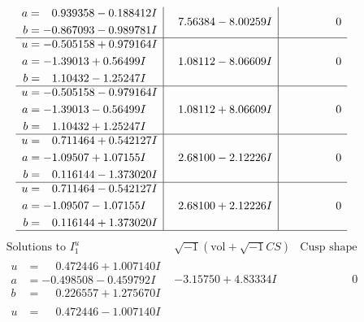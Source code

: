 \documentclass[1p]{elsarticle_modified}
\theoremstyle{definition}
\newcommand{\I}{\sqrt{-1}}
\begin{document}
$$\begin{array}{c|c|c}
\begin{aligned}
a &= \phantom{-}0.939358 - 0.188412 I \\
b &= -0.867093 - 0.989781 I\end{aligned}
 & \phantom{-}7.56384 - 8.00259 I & \phantom{-0.000000 } 0 \\ \hline\begin{aligned}
u &= -0.505158 + 0.979164 I \\
a &= -1.39013 + 0.56499 I \\
b &= \phantom{-}1.10432 - 1.25247 I\end{aligned}
 & \phantom{-}1.08112 - 8.06609 I & \phantom{-0.000000 } 0 \\ \hline\begin{aligned}
u &= -0.505158 - 0.979164 I \\
a &= -1.39013 - 0.56499 I \\
b &= \phantom{-}1.10432 + 1.25247 I\end{aligned}
 & \phantom{-}1.08112 + 8.06609 I & \phantom{-0.000000 } 0 \\ \hline\begin{aligned}
u &= \phantom{-}0.711464 + 0.542127 I \\
a &= -1.09507 + 1.07155 I \\
b &= \phantom{-}0.116144 - 1.373020 I\end{aligned}
 & \phantom{-}2.68100 - 2.12226 I & \phantom{-0.000000 } 0 \\ \hline\begin{aligned}
u &= \phantom{-}0.711464 - 0.542127 I \\
a &= -1.09507 - 1.07155 I \\
b &= \phantom{-}0.116144 + 1.373020 I\end{aligned}
 & \phantom{-}2.68100 + 2.12226 I & \phantom{-0.000000 } 0\\
 \hline 
 \end{array}$$\newpage$$\begin{array}{c|c|c}  
\text{Solutions to }I^u_{1}& \I (\text{vol} + \sqrt{-1}CS) & \text{Cusp shape}\\
 \hline 
\begin{aligned}
u &= \phantom{-}0.472446 + 1.007140 I \\
a &= -0.498508 - 0.459792 I \\
b &= \phantom{-}0.226557 + 1.275670 I\end{aligned}
 & -3.15750 + 4.83334 I & \phantom{-0.000000 } 0 \\ \hline\begin{aligned}
u &= \phantom{-}0.472446 - 1.007140 I \\

\end{aligned}
\end{array}$$
\end{document}

